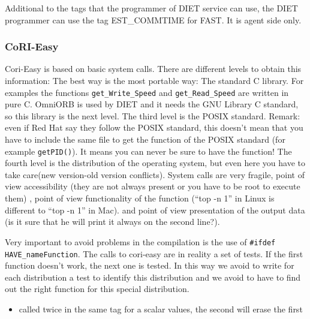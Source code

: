   Additional to the tags that the programmer of DIET
  service can use, the DIET programmer can use 
  the tag EST\_COMMTIME for FAST. It is agent side only. 

  \subsubsection{CoRI-Easy}
  Cori-Easy is based on basic system calls. There are different
   levels to obtain this information: 
  The best way is the most portable way: The standard C library. For examples the
  functions \texttt{get\_Write\_Speed} and \texttt{get\_Read\_Speed} are written in pure C.
  OmniORB is used by DIET and it needs the GNU Library C standard, 
  so this library is the next level.
  The third level is the POSIX standard. Remark: even if Red Hat 
  say they follow the POSIX standard, this doesn't mean that you have to include the same file
  to get the function of the POSIX standard (for example \texttt{getPID()}). 
  It means you can never be sure to have the function!
  The fourth level is the distribution of the operating system, 
  but even here you have to take care(new version-old version conflicts). 
  System calls are very fragile, point of view accessibility 
  (they are not always present or you have to be root to execute them)
  , point of view functionality of the function (``top -n 1'' 
  in Linux is different to ``top -n 1'' in Mac).
  and point of view presentation of the output data (is it sure that 
  he will print it always on the second line?).

  Very important to avoid problems in the compilation is the use of 
   \texttt{\#ifdef HAVE\_nameFunction}.  
  The calls to cori-easy are in reality a set of tests. If the first function doesn't work,
  the next one is tested. In this way we avoid to write for each 
  distribution a test to identify this distribution and we avoid to 
  have to find out the right function for this special distribution.

  \begin{itemize}
 \item called twice in the same tag for a scalar values, the second will erase the first
  \end{itemize} 
%   
